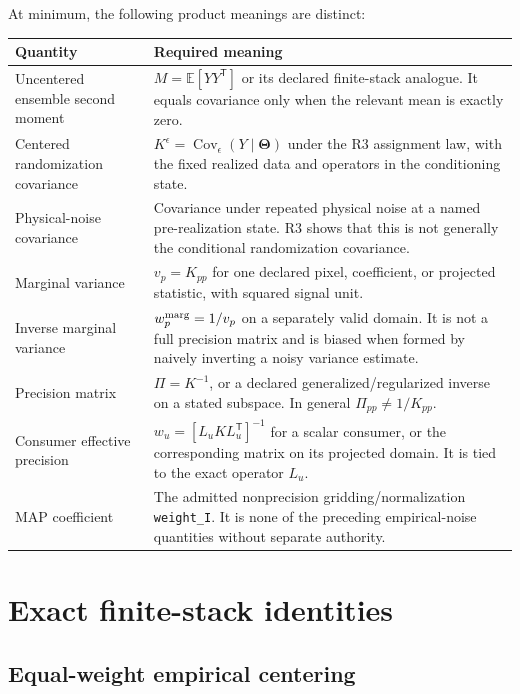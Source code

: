 \documentclass[11pt]{article}
\newcommand{\E}{\mathbb{E}}
\newcommand{\Cov}{\operatorname{Cov}}
\newcommand{\ThetaV}{\boldsymbol{\Theta}}
\begin{document}
At minimum, the following product meanings are distinct:
\begin{longtable}{>{\raggedright\arraybackslash}p{}
                  >{\raggedright\arraybackslash}p{}}
\toprule
Quantity & Required meaning \\
\midrule
\endhead
Uncentered ensemble second moment &
$M=\E[YY^{\mathsf T}]$ or its declared finite-stack analogue.  It equals
covariance only when the relevant mean is exactly zero. \\
Centered randomization covariance &
$K^\epsilon=\Cov_\epsilon(Y\mid\ThetaV)$ under the R3 assignment law, with
the fixed realized data and operators in the conditioning state. \\
Physical-noise covariance &
Covariance under repeated physical noise at a named pre-realization state.
R3 shows that this is not generally the conditional randomization covariance. \\
Marginal variance &
$v_p=K_{pp}$ for one declared pixel, coefficient, or projected statistic,
with squared signal unit. \\
Inverse marginal variance &
$w_p^{\rm marg}=1/v_p$ on a separately valid domain.  It is not a full
precision matrix and is biased when formed by naively inverting a noisy
variance estimate. \\
Precision matrix &
$\Pi=K^{-1}$, or a declared generalized/regularized inverse on a stated
subspace.  In general $\Pi_{pp}\ne1/K_{pp}$. \\
Consumer effective precision &
$w_u=[L_uKL_u^{\mathsf T}]^{-1}$ for a scalar consumer, or the corresponding
matrix on its projected domain.  It is tied to the exact operator $L_u$. \\
MAP coefficient &
The admitted nonprecision gridding/normalization \texttt{weight\_I}.  It is
none of the preceding empirical-noise quantities without separate authority. \\
\bottomrule
\end{longtable}

\section{Exact finite-stack identities}

\subsection{Equal-weight empirical centering}
\end{document}
